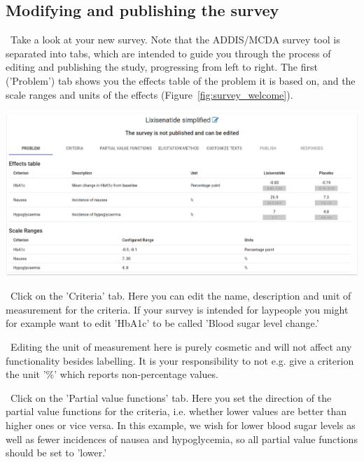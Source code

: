 \documentclass[00_mcda_tutorial.tex]{subfiles}
\begin{document}
\begin{sidebar*}
\subsection*{Modifying and publishing the survey}

\noindent \leftpointright \, Take a look at your new survey. Note that the ADDIS/MCDA survey tool is separated into tabs, which are intended to guide you through the process of editing and publishing the study, progressing from left to right. The first ('Problem') tab shows you the effects table of the problem it is based on, and the scale ranges and units of the effects (Figure~\ref{fig:survey_welcome}).
\newline

{	
	\centering
	\includegraphics[width=\textwidth]{fig/surveyWelcome.png}
	\label{fig:survey_welcome}
	\par
}


\noindent \leftpointright \, Click on the 'Criteria' tab. Here you can edit the name, description and unit of measurement for the criteria. If your survey is intended for laypeople you might for example want to edit 'HbA1c' to be called 'Blood sugar level change.'
\newline

\noindent \faExclamationTriangle \, Editing the unit of measurement here is purely cosmetic and will not affect any functionality besides labelling. It is your responsibility to not e.g. give a criterion the unit '\%' which reports non-percentage values.
\newline

\noindent \leftpointright \, Click on the 'Partial value functions' tab. Here you set the direction of the partial value functions for the criteria, i.e. whether lower values are better than higher ones or vice versa. In this example, we wish for lower blood sugar levels as well as fewer incidences of nausea and hypoglycemia, so all partial value functions should be set to 'lower.'
\newline


\end{sidebar*}
\end{document}
